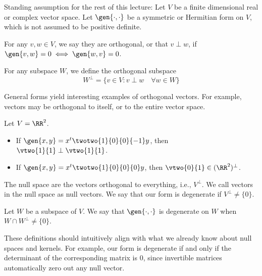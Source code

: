 Standing assumption for the rest of this lecture: Let $V$ be a finite dimensional real or complex vector space. Let $\gen{\cdot, \cdot}$ be a symmetric or Hermitian form on $V$, which is not assumed to be positive definite. 

\begin{definition}

For any $v,w\in V$, we say they are \ac{orthogonal}, or that $v\perp w$, if $\gen{v,w} = 0\iff \gen{w,v} = 0$. 
\end{definition}

\begin{definition}

For any subspace $W$, we define the orthogonal subspace 
\[W^{\perp} = \{v\in V : v\perp w \quad\forall w\in W\}\]
\end{definition}

General forms yield interesting examples of orthogonal vectors. For example, vectors may be orthogonal to itself, or to the entire vector space. 

\begin{example}
\exlabel

Let $V = \RR^2$. 

\begin{itemize}
    \item If $\gen{x,y} = x^t \twotwo{1}{0}{0}{-1} y$, then $\vtwo{1}{1}\perp \vtwo{1}{1}$. 
    \item If $\gen{x,y} = x^t \twotwo{1}{0}{0}{0} y$, then $\vtwo{0}{1}\in (\RR^2)^{\perp}$. 
\end{itemize}
\end{example}

\begin{definition}

The \ac{null space} are the vectors orthogonal to everything, i.e., $V^{\perp}$. We call vectors in the null space as \ac{null vectors}. We say that our form is \ac{degenerate} if $V^{\perp}\neq \{0\}$. \V

Let $W$ be a subspace of $V$. We say that $\gen{\cdot, \cdot}$ is degenerate on $W$ when $W\cap W^\perp \neq \{0\}$. 
\end{definition}

These definitions should intuitively align with what we already know about null spaces and kernels. For example, our form is degenerate if and only if the determinant of the corresponding matrix is $0$, since invertible matrices automatically zero out any null vector. 


